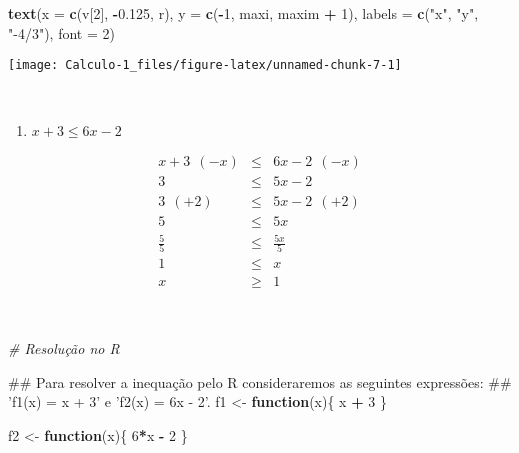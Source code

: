 \documentclass[]{book}
\newenvironment{Shaded}{\begin{snugshade}}{\end{snugshade}}
\newcommand{\KeywordTok}[1]{\textcolor[rgb]{0.13,0.29,0.53}{\textbf{#1}}}
\newcommand{\DataTypeTok}[1]{\textcolor[rgb]{0.13,0.29,0.53}{#1}}
\newcommand{\DecValTok}[1]{\textcolor[rgb]{0.00,0.00,0.81}{#1}}
\newcommand{\FloatTok}[1]{\textcolor[rgb]{0.00,0.00,0.81}{#1}}
\newcommand{\StringTok}[1]{\textcolor[rgb]{0.31,0.60,0.02}{#1}}
\newcommand{\CommentTok}[1]{\textcolor[rgb]{0.56,0.35,0.01}{\textit{#1}}}
\newcommand{\ControlFlowTok}[1]{\textcolor[rgb]{0.13,0.29,0.53}{\textbf{#1}}}
\newcommand{\OperatorTok}[1]{\textcolor[rgb]{0.81,0.36,0.00}{\textbf{#1}}}
\newcommand{\NormalTok}[1]{#1}
\providecommand{\tightlist}{%
  \setlength{\itemsep}{0pt}\setlength{\parskip}{0pt}}
\begin{document}
\begin{enumerate}
\begin{Shaded}
\begin{Highlighting}[]
\KeywordTok{text}\NormalTok{(}\DataTypeTok{x =} \KeywordTok{c}\NormalTok{(v[}\DecValTok{2}\NormalTok{], }\OperatorTok{-}\FloatTok{0.125}\NormalTok{, r), }\DataTypeTok{y =} \KeywordTok{c}\NormalTok{(}\OperatorTok{-}\DecValTok{1}\NormalTok{, maxi, maxim }\OperatorTok{+}\StringTok{ }\DecValTok{1}\NormalTok{),}
 \DataTypeTok{labels =} \KeywordTok{c}\NormalTok{(}\StringTok{"x"}\NormalTok{, }\StringTok{"y"}\NormalTok{, }\StringTok{"-4/3"}\NormalTok{), }\DataTypeTok{font =} \DecValTok{2}\NormalTok{)}
\end{Highlighting}
\end{Shaded}

  \begin{center}\texttt{[image: Calculo-1\_files/figure-latex/unnamed-chunk-7-1]} \end{center}

  ~

  \begin{enumerate}
  \def\labelenumii{\alph{enumii})}
  \setcounter{enumii}{3}
  \tightlist
  \item
    \(x+3 \leqslant 6x-2\)
  \end{enumerate}

  \begin{eqnarray}
  x+3 \ \ (-x) &\leqslant& 6x-2 \ \ (-x) \nonumber \\
  3 &\leqslant& 5x-2 \nonumber \\
  3 \ \ (+2) &\leqslant& 5x-2 \ \ (+2) \nonumber \\
  5 &\leqslant& 5x \nonumber \\
  \frac{5}{5} &\leqslant& \frac{5x}{5} \nonumber \\
  1 &\leqslant& x \nonumber \\
  x &\geqslant& 1 \nonumber
  \end{eqnarray}

  ~

\begin{Shaded}
\begin{Highlighting}[]
\CommentTok{# Resolução no R}

\NormalTok{##  Para resolver a inequação pelo R consideraremos as seguintes expressões:}
\NormalTok{## 'f1(x) = x + 3' e 'f2(x) = 6x - 2'.}
\NormalTok{f1 <-}\StringTok{ }\ControlFlowTok{function}\NormalTok{(x)\{}
\NormalTok{  x }\OperatorTok{+}\StringTok{ }\DecValTok{3}
\NormalTok{\}}

\NormalTok{f2 <-}\StringTok{ }\ControlFlowTok{function}\NormalTok{(x)\{}
  \DecValTok{6}\OperatorTok{*}\NormalTok{x }\OperatorTok{-}\StringTok{ }\DecValTok{2}
\NormalTok{\}}


\end{Highlighting}
\end{Shaded}
\end{enumerate}
\end{document}
